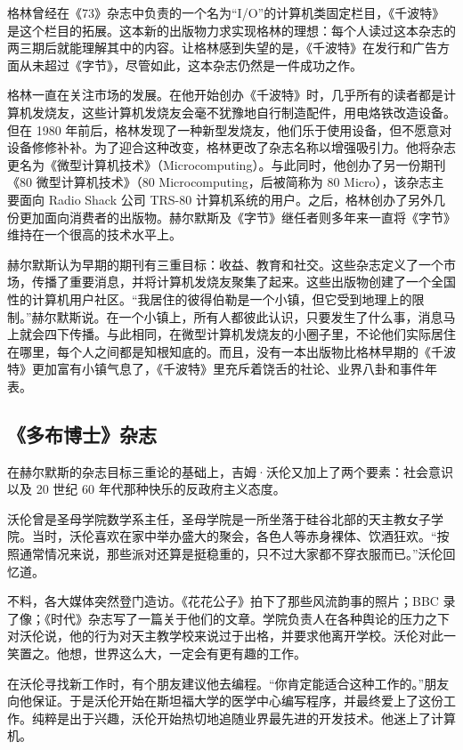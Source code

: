 \documentclass[12pt,UTF8]{ctexbook}
\begin{document}
格林曾经在《73》杂志中负责的一个名为“I/O”的计算机类固定栏目，《千波特》是这个栏目的拓展。这本新的出版物力求实现格林的理想：每个人读过这本杂志的两三期后就能理解其中的内容。让格林感到失望的是，《千波特》在发行和广告方面从未超过《字节》，尽管如此，这本杂志仍然是一件成功之作。

格林一直在关注市场的发展。在他开始创办《千波特》时，几乎所有的读者都是计算机发烧友，这些计算机发烧友会毫不犹豫地自行制造配件，用电烙铁改造设备。但在 1980 年前后，格林发现了一种新型发烧友，他们乐于使用设备，但不愿意对设备修修补补。为了迎合这种改变，格林更改了杂志名称以增强吸引力。他将杂志更名为《微型计算机技术》（Microcomputing）。与此同时，他创办了另一份期刊《80 微型计算机技术》（80 Microcomputing，后被简称为 80 Micro），该杂志主要面向 Radio Shack 公司 TRS-80 计算机系统的用户。之后，格林创办了另外几份更加面向消费者的出版物。赫尔默斯及《字节》继任者则多年来一直将《字节》维持在一个很高的技术水平上。

赫尔默斯认为早期的期刊有三重目标：收益、教育和社交。这些杂志定义了一个市场，传播了重要消息，并将计算机发烧友聚集了起来。这些出版物创建了一个全国性的计算机用户社区。“我居住的彼得伯勒是一个小镇，但它受到地理上的限制。”赫尔默斯说。在一个小镇上，所有人都彼此认识，只要发生了什么事，消息马上就会四下传播。与此相同，在微型计算机发烧友的小圈子里，不论他们实际居住在哪里，每个人之间都是知根知底的。而且，没有一本出版物比格林早期的《千波特》更加富有小镇气息了，《千波特》里充斥着饶舌的社论、业界八卦和事件年表。





\subsection{《多布博士》杂志}


在赫尔默斯的杂志目标三重论的基础上，吉姆·沃伦又加上了两个要素：社会意识以及 20 世纪 60 年代那种快乐的反政府主义态度。

沃伦曾是圣母学院数学系主任，圣母学院是一所坐落于硅谷北部的天主教女子学院。当时，沃伦喜欢在家中举办盛大的聚会，各色人等赤身裸体、饮酒狂欢。“按照通常情况来说，那些派对还算是挺稳重的，只不过大家都不穿衣服而已。”沃伦回忆道。

不料，各大媒体突然登门造访。《花花公子》拍下了那些风流韵事的照片；BBC 录了像；《时代》杂志写了一篇关于他们的文章。学院负责人在各种舆论的压力之下对沃伦说，他的行为对天主教学校来说过于出格，并要求他离开学校。沃伦对此一笑置之。他想，世界这么大，一定会有更有趣的工作。

在沃伦寻找新工作时，有个朋友建议他去编程。“你肯定能适合这种工作的。”朋友向他保证。于是沃伦开始在斯坦福大学的医学中心编写程序，并最终爱上了这份工作。纯粹是出于兴趣，沃伦开始热切地追随业界最先进的开发技术。他迷上了计算机。
\end{document}
